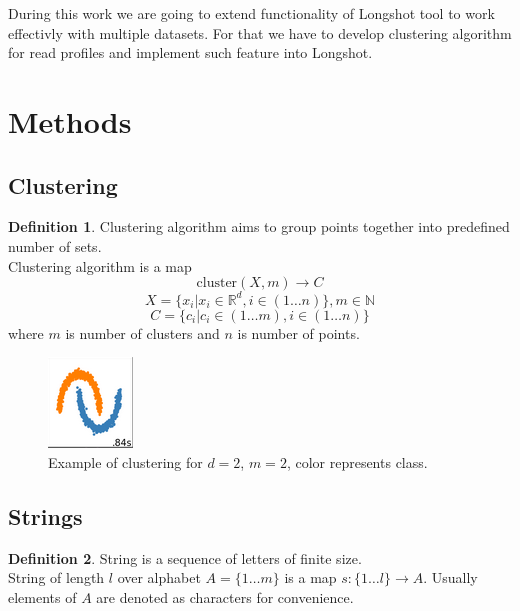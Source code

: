 \documentclass[a4paper, 12pt]{article}
\theoremstyle{definition}
\newtheorem{definition}{Definition}[section]
\theoremstyle{definition}
\theoremstyle{remark}
\begin{document}
During this work we are going to extend functionality of 
Longshot tool to work effectivly with multiple datasets. 
For that we have to develop clustering algorithm for 
read profiles and implement such feature into Longshot. 


\newpage
\section{Methods}
\subsection{Clustering}
\begin{definition}
    Clustering algorithm aims to group points together into predefined number of sets. \\
    Clustering algorithm is a map 
    $$\text{cluster} (X, m) \rightarrow C$$
    $$X = \{x_i | x_i \in \mathbb{R}^d, i \in \left( 1 \ldots n \right) \}, m \in \mathbb{N}$$
    $$C = \{ c_i | c_i \in \left( 1 \ldots m \right), i \in \left( 1 \ldots n \right)\}$$
    where $m$ is number of clusters and $n$ is number of points. 
\end{definition}

\begin{figure}[H]
    \includegraphics{example_clustering}
    \centering
    \caption{Example of clustering for $d=2$, $m=2$, color represents class.}
\end{figure}

\subsection{Strings}

\begin{definition}
    String is a sequence of letters of finite size. \\
    String of length $l$ over alphabet $A = \{ 1 \ldots m \}$ is a map $s: \{ 1 \ldots l\} \rightarrow A$.
    Usually elements of $A$ are denoted as characters for convenience.
\end{definition}
\end{document}
